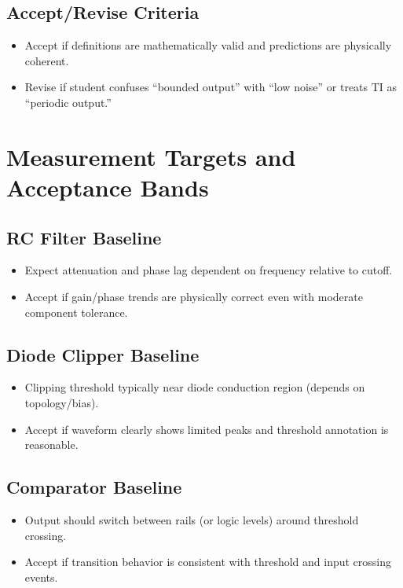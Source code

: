 \documentclass[11pt,letterpaper]{article}
\begin{document}
\subsection*{Accept/Revise Criteria}
\begin{itemize}[leftmargin=1.2em]
    \item Accept if definitions are mathematically valid and predictions are physically coherent.
    \item Revise if student confuses ``bounded output'' with ``low noise'' or treats TI as ``periodic output.''
\end{itemize}

\section{Measurement Targets and Acceptance Bands}

\subsection*{RC Filter Baseline}
\begin{itemize}[leftmargin=1.2em]
    \item Expect attenuation and phase lag dependent on frequency relative to cutoff.
    \item Accept if gain/phase trends are physically correct even with moderate component tolerance.
\end{itemize}

\subsection*{Diode Clipper Baseline}
\begin{itemize}[leftmargin=1.2em]
    \item Clipping threshold typically near diode conduction region (depends on topology/bias).
    \item Accept if waveform clearly shows limited peaks and threshold annotation is reasonable.
\end{itemize}

\subsection*{Comparator Baseline}
\begin{itemize}[leftmargin=1.2em]
    \item Output should switch between rails (or logic levels) around threshold crossing.
    \item Accept if transition behavior is consistent with threshold and input crossing events.
\end{itemize}
\end{document}
